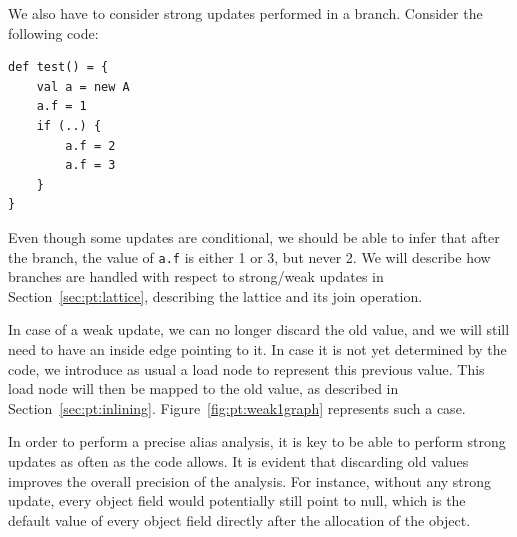 We also have to consider strong updates performed in a branch. Consider the
following code:

\begin{lstlisting}
def test() = {
    val a = new A
    a.f = 1
    if (..) {
        a.f = 2
        a.f = 3
    }
}
\end{lstlisting}

Even though some updates are conditional, we should be able to infer that
after the branch, the value of \verb/a.f/ is either 1 or 3, but never 2. We
will describe how branches are handled with respect to strong/weak updates in
Section~\ref{sec:pt:lattice}, describing the lattice and its join operation.

In case of a weak update, we can no longer discard the old value, and we will
still need to have an inside edge pointing to it. In case it is not yet
determined by the code, we introduce as usual a load node to represent this
previous value. This load node will then be mapped to the old value, as
described in Section~\ref{sec:pt:inlining}. Figure~\ref{fig:pt:weak1graph}
represents such a case.

In order to perform a precise alias analysis, it is key to be able to perform
strong updates as often as the code allows. It is evident that discarding old
values improves the overall precision of the analysis. For instance, without
any strong update, every object field would potentially still point to null,
which is the default value of every object field directly after the allocation
of the object.

